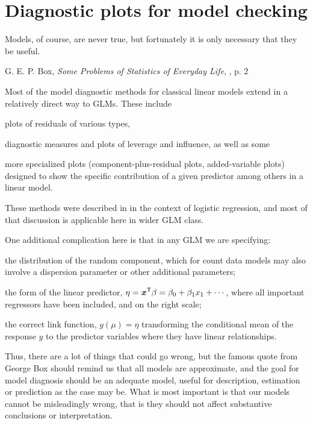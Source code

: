 \documentclass[11pt]{book}\usepackage[]{graphicx}\usepackage[]{color}
\begin{document}
\section{Diagnostic plots for model checking}\label{sec:glm-diag}

\epigraph{Models, of course, are never true, but fortunately it is only necessary that they be useful.}{G. E. P. Box, 
\emph{Some Problems of Statistics of Everyday Life}, \citeyear{Box:1979}, p. 2}

Most of the model diagnostic methods for classical linear models extend in a relatively direct way
to GLMs.  
These include 
\begin{seriate}
  \item plots of residuals of various types, 
  \item diagnostic measures and plots of leverage and influence,
as well as some 
  \item more specialized plots (component-plus-residual plots, added-variable plots)
designed to show the specific contribution of a given predictor among others in a linear model.
\end{seriate}
These methods were described in  in the context of logistic regression,
and most of that discussion is applicable here in wider GLM class.

One additional complication here is that in any GLM we are specifying:
\begin{seriate}
  \item the distribution of the random component, which for count data models may also involve a dispersion
  parameter or other additional parameters;
  \item the form of the linear predictor, $\eta = \bm{x}^\mathsf{T} \beta = \beta_0 + \beta_1 x_1 + \cdots$,
  where all important regressors have been included, and on the right scale;
  \item the correct link function, $g(\mu) = \eta$
  transforming the conditional mean of the response $y$ to the predictor variables where they have linear
  relationships.
\end{seriate}

Thus, there are a lot of things that could go wrong, but the famous quote from George Box should remind us
that all models are approximate, and the goal for model diagnosis should be an adequate model, useful
for description, estimation or prediction as the case may be. What is most important is that our models
cannot be misleadingly wrong, that is they should not affect substantive conclusions or interpretation.
\end{document}
